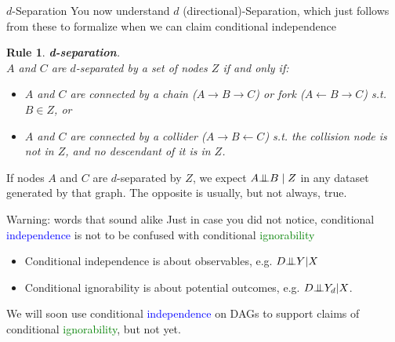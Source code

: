 \documentclass[xcolor=dvipsnames]{beamer}
\newtheorem{arule}{Rule}
\newcommand{\indep}{{\bot\negthickspace\negthickspace\bot}}
\begin{document}
\begin{frame}{$d$-Separation}
\small 
You now understand  $d$ (directional)-Separation, which just follows from these to formalize when we can claim conditional independence

\begin{arule}
\textbf{d-separation}. \\ $A$ and $C$ are $d$-separated by a set of nodes $Z$ if  and only if:\\
\begin{itemize}
\item $A$ and $C$ are connected by a chain ($A \rightarrow B \rightarrow C$) or fork ($A \leftarrow B \rightarrow C$) s.t. $B \in Z$, or
\item $A$ and $C$ are connected by a collider ($A \rightarrow B \leftarrow C$) s.t.  the collision node is not in $Z$, and no descendant of it is in $Z$. 
\end{itemize}
\end{arule}

  If nodes $A$ and $C$ are $d$-separated by $Z$, we expect $A \indep B \mid Z$ in any dataset generated by that graph. The opposite is usually, but not always, true. \\
\end{frame}

\begin{frame}{Warning: words that sound alike}
Just in case you did not notice, conditional \textcolor{Blue}{independence} is not to be confused with conditional \textcolor{Green}{ignorability}
\medskip
\begin{itemize}
\item<2-> Conditional independence is about observables, e.g. $D \indep Y | X$
\smallskip
\item<3-> Conditional ignorability is about potential outcomes, e.g. $D \indep Y_d | X$. 
\end{itemize}
\medskip
{}  We will soon use conditional \textcolor{Blue}{independence} on DAGs to support claims of conditional \textcolor{Green}{ignorability}, but not yet. %

\end{frame}
\end{document}
